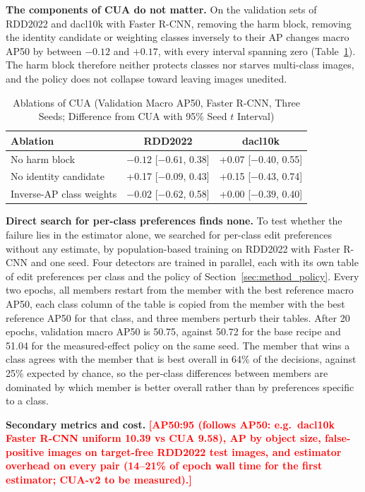 \documentclass[conference]{IEEEtran}
\newcommand{\todo}[1]{\textcolor{red}{\textbf{[#1]}}}
\begin{document}
\noindent\textbf{The components of CUA do not matter.} On the validation sets of RDD2022 and dacl10k with Faster R-CNN, removing the harm block, removing the identity candidate or weighting classes inversely to their AP changes macro AP50 by between $-0.12$ and $+0.17$, with every interval spanning zero (Table~\ref{tab:ablations}). The harm block therefore neither protects classes nor starves multi-class images, and the policy does not collapse toward leaving images unedited.

\begin{table}[t]
\caption{Ablations of CUA (Validation Macro AP50, Faster R-CNN, Three Seeds; Difference from CUA with 95\% Seed $t$ Interval)}
\label{tab:ablations}
\centering
\footnotesize
\setlength{\tabcolsep}{3pt}
\begin{tabular}{@{}lcc@{}}
\toprule
\textbf{Ablation} & \textbf{RDD2022} & \textbf{dacl10k} \\
\midrule
No harm block & $-0.12$ [$-0.61$, 0.38] & +0.07 [$-0.40$, 0.55] \\
No identity candidate & +0.17 [$-0.09$, 0.43] & +0.15 [$-0.43$, 0.74] \\
Inverse-AP class weights & $-0.02$ [$-0.62$, 0.58] & +0.00 [$-0.39$, 0.40] \\
\bottomrule
\end{tabular}
\end{table}

\noindent\textbf{Direct search for per-class preferences finds none.} To test whether the failure lies in the estimator alone, we searched for per-class edit preferences without any estimate, by population-based training on RDD2022 with Faster R-CNN and one seed. Four detectors are trained in parallel, each with its own table of edit preferences per class and the policy of Section~\ref{sec:method_policy}. Every two epochs, all members restart from the member with the best reference macro AP50, each class column of the table is copied from the member with the best reference AP50 for that class, and three members perturb their tables. After 20 epochs, validation macro AP50 is 50.75, against 50.72 for the base recipe and 51.04 for the measured-effect policy on the same seed. The member that wins a class agrees with the member that is best overall in 64\% of the decisions, against 25\% expected by chance, so the per-class differences between members are dominated by which member is better overall rather than by preferences specific to a class.

\noindent\textbf{Secondary metrics and cost.} \todo{AP50:95 (follows AP50: e.g.\ dacl10k Faster R-CNN uniform 10.39 vs CUA 9.58), AP by object size, false-positive images on target-free RDD2022 test images, and estimator overhead on every pair (14--21\% of epoch wall time for the first estimator; CUA-v2 to be measured).}
\end{document}
